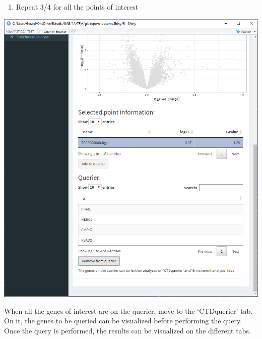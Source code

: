 \documentclass[
]{book}
\providecommand{\tightlist}{%
  \setlength{\itemsep}{0pt}\setlength{\parskip}{0pt}}
\begin{document}
\begin{enumerate}
\def\labelenumi{\arabic{enumi}.}
\setcounter{enumi}{4}
\tightlist
\item
  Repeat 3/4 for all the points of interest
\end{enumerate}

\includegraphics{images/analysis10_2_3.png}

When all the genes of interest are on the querier, move to the `CTDquerier' tab. On it, the genes to be queried can be visualized before performing the query. Once the query is performed, the results can be visualized on the different tabs.
\end{document}
